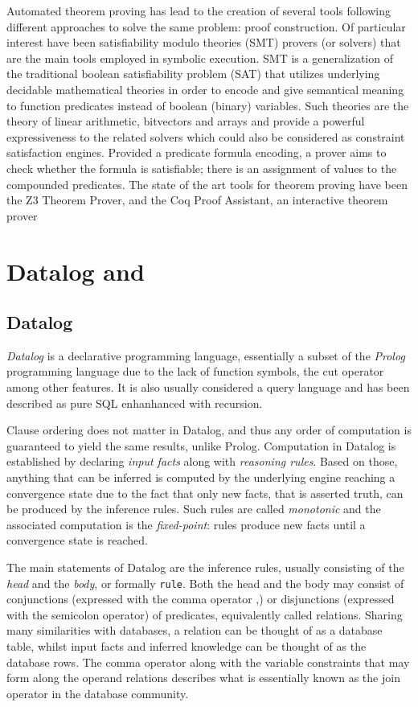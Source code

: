 Automated theorem proving has lead to the creation of several tools following
different approaches to solve the same problem: proof construction. Of particular
interest have been satisfiability modulo theories (SMT) provers (or solvers)
that are the main tools employed in symbolic execution. SMT is a generalization
of the traditional boolean satisfiability problem (SAT) that utilizes underlying
decidable mathematical theories in order to encode and give semantical
meaning to function predicates instead of boolean (binary) variables. Such theories
are the theory of linear arithmetic, bitvectors and arrays and provide a powerful
expressiveness to the related solvers which could also be considered as
constraint satisfaction engines. Provided a predicate formula encoding, a prover
aims to check whether the formula is satisfiable; there is an assignment of values
to the compounded predicates. The state of the art tools for theorem proving
have been the Z3 Theorem Prover\cite{de2008z3}, and the Coq Proof
Assistant\cite{Coq}, an interactive theorem prover

\section{Datalog and \doop{}}

\subsection{Datalog}

\textit{Datalog} is a declarative programming language, essentially a subset of the  \textit{Prolog}
programming language due to the lack of function symbols, the cut operator among
other features. It is also usually considered a query language and has been described
as pure SQL enhanhanced with recursion.

Clause ordering does not matter in Datalog, and thus any order of computation is
guaranteed to yield the same results, unlike Prolog. Computation in Datalog is
established by declaring \textit{input facts} along with \textit{reasoning rules}. Based on those,
anything that can be inferred is computed by the underlying engine reaching
a convergence state due to the fact that only new facts, that is asserted truth,
can be produced by the inference rules. Such rules are called \textit{monotonic} and
the associated computation is the \emph{fixed-point}: rules produce new facts
until a convergence state is reached.

The main statements of Datalog are the inference rules, usually consisting of
the \emph{head} and the \emph{body}, or formally \texttt{rule}. Both the head and the body
may consist of conjunctions (expressed with the comma operator ,) or
disjunctions (expressed with the semicolon operator) of predicates, equivalently called
relations. Sharing many similarities with databases, a relation can be thought
of as a database table, whilst input facts and inferred knowledge can be thought of as
the database rows. The comma operator along with the variable constraints that
may form along the operand relations describes what is essentially known
as the join operator in the database community.

